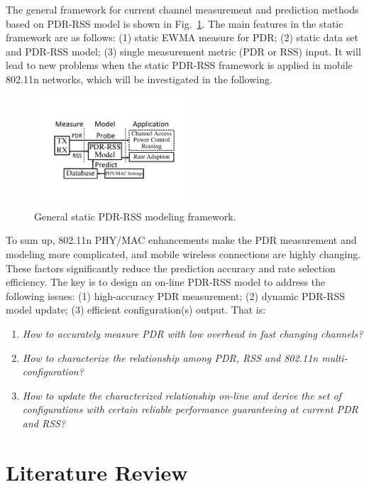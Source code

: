 \documentclass[draftclsnofoot,journal,onecolumn,11pt]{IEEEtran}
\begin{document}
The general framework for current channel measurement and prediction methods based on PDR-RSS model is shown in Fig.~\ref{offlinemodel}. The main features in the static framework are as follows: (1) static EWMA measure for PDR; (2) static data set and PDR-RSS model; (3) single measurement metric (PDR or RSS) input. It will lead to new problems when the static PDR-RSS framework is applied in mobile 802.11n networks, which will be investigated in the following.

\begin{figure}[!htp]
\centering
\includegraphics[width=0.5\textwidth]{modeling1.pdf}
\caption{General static PDR-RSS modeling framework.}
\label{offlinemodel}
\end{figure}

To sum up, 802.11n PHY/MAC enhancements make the PDR measurement and modeling more complicated, and mobile wireless connections are highly changing. These factors significantly reduce the prediction accuracy and rate selection efficiency. The key is to design an on-line PDR-RSS model to address the following issues: (1) high-accuracy PDR measurement; (2) dynamic PDR-RSS model update; (3) efficient configuration(s) output. That is:
\begin{enumerate}
  \item \textit{How to accurately measure PDR with low overhead in fast changing channels?}
  \item \textit{How to characterize the relationship among PDR, RSS and 802.11n multi-configuration?}
  \item \textit{How to update the characterized relationship on-line and derive the set of configurations with certain reliable performance guaranteeing at current PDR and RSS?}
\end{enumerate}

\section{Literature Review}
\end{document}
